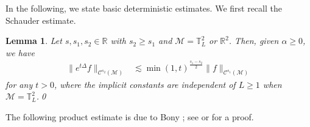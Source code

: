 \documentclass[letterpaper, 11pt,  reqno]{amsart}
\newtheorem{lemma}[theorem]{Lemma}
\theoremstyle{myremark}
\newcommand{\1}{\hspace{0.5mm}\text{I}\hspace{0.5mm}}
\newcommand{\noi}{\noindent}
\newcommand{\Z}{\mathbb{Z}}
\newcommand{\R}{\mathbb{R}}
\newcommand{\T}{\mathbb{T}}
\newcommand{\CC}{\mathcal{C}}
\newcommand{\al}{\alpha}
\newcommand{\nb}{\nabla}
\newcommand{\Dl}{\Delta}
\newcommand{\ft}{\widehat}
\newcommand{\les}{\lesssim}
\newcommand{\jb}[1]
{\langle #1 \rangle}
\newcommand{\MM}{\mathcal{M}}
\numberwithin{equation}{section}
\numberwithin{theorem}{section}
\begin{document}
In the following, we
state basic deterministic estimates.
We first recall the Schauder estimate.
 

\begin{lemma}\label{LEM:Schauder}
Let  $s, s_1, s_2 \in \R$ with $s_2 \ge s_1$
and  $\mathcal M = \T^2_L$ or $\R^2$. Then, 
given $\al \ge 0$, 
we have
\begin{align*}
\|e^{t\Dl} f \|_{\CC^{s_2}(\MM)} & \les \min(1,t)^{\frac{s_1 - s_2}{2}} \|f\|_{\CC^{s_1}(\MM)}
\end{align*}
for any $t > 0$, 
where the implicit constants are independent of $ L \ge 1$
when $\MM = \T^2_L$.\qed
\end{lemma}


%
%
%



%


The following product estimate is due to Bony \cite{Bony};
 see  \cite[Lemma 2.1]{GIP} or \cite[Section 3]{MW2} for a proof.
\end{document}
